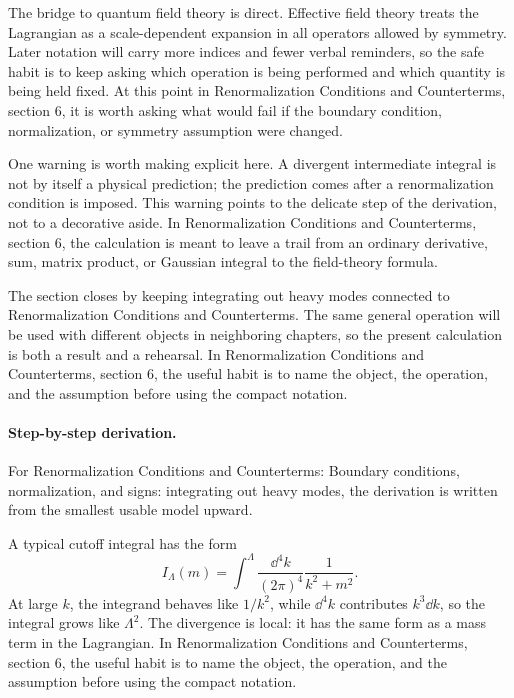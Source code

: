 The bridge to quantum field theory is direct.  Effective field theory treats the Lagrangian as a scale-dependent expansion in all operators allowed by symmetry.  Later notation will carry more indices and fewer verbal reminders, so the safe habit is to keep asking which operation is being performed and which quantity is being held fixed.  At this point in Renormalization Conditions and Counterterms, section 6, it is worth asking what would fail if the boundary condition, normalization, or symmetry assumption were changed.

One warning is worth making explicit here.  A divergent intermediate integral is not by itself a physical prediction; the prediction comes after a renormalization condition is imposed.  This warning points to the delicate step of the derivation, not to a decorative aside.  In Renormalization Conditions and Counterterms, section 6, the calculation is meant to leave a trail from an ordinary derivative, sum, matrix product, or Gaussian integral to the field-theory formula.

The section closes by keeping integrating out heavy modes connected to Renormalization Conditions and Counterterms.  The same general operation will be used with different objects in neighboring chapters, so the present calculation is both a result and a rehearsal.  In Renormalization Conditions and Counterterms, section 6, the useful habit is to name the object, the operation, and the assumption before using the compact notation.



\paragraph{Step-by-step derivation.}

For Renormalization Conditions and Counterterms: Boundary conditions, normalization, and signs: integrating out heavy modes, the derivation is written from the smallest usable model upward.

A typical cutoff integral has the form
\[
  I_\Lambda(m)=\int^{\Lambda}\frac{\dd^4k}{(2\pi)^4}\frac{1}{k^2+m^2}.
\]
At large \(k\), the integrand behaves like \(1/k^2\), while \(\dd^4k\) contributes \(k^3\dd k\), so the integral grows like \(\Lambda^2\).  The divergence is local: it has the same form as a mass term in the Lagrangian.  In Renormalization Conditions and Counterterms, section 6, the useful habit is to name the object, the operation, and the assumption before using the compact notation.

